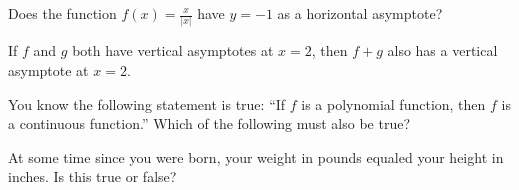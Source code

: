 \documentclass{ximera}
\newcommand{\recommendation}[1]{}
\newcommand{\GoodQuestions}[1]{}
\begin{document}
\begin{shuffle}
\begin{problem}
  Does the function $f(x) = \frac{x}{|x|}$ have $y=-1$ as a horizontal asymptote?
  \begin{multipleChoice}
  \end{multipleChoice}
\end{problem}

\begin{problem}
  If $f$ and $g$ both have vertical asymptotes at $x=2$, then
  $f+g$ also has a vertical asymptote at $x=2$.
  \begin{multipleChoice}
  \end{multipleChoice}
\end{problem}




\begin{problem}
  You know the following statement is true: ``If $f$ is a polynomial
  function, then $f$ is a continuous function.''  Which of the
  following must also be true?
  \begin{multipleChoice}
  \end{multipleChoice}
\end{problem}


\begin{problem}
  At some time since you were born, your weight in pounds equaled your height in inches.  Is this true or false?
\begin{multipleChoice}
\end{multipleChoice}
\end{problem}



\end{shuffle}
\end{document}
